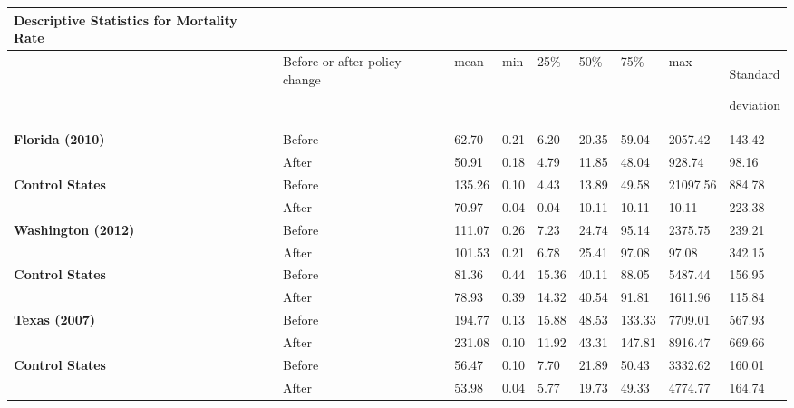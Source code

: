 \documentclass{article}
\begin{document}
\begin{longtable}[]{@{}lllllllll@{}}
\toprule
\textbf{Descriptive Statistics for Mortality Rate} & & & & & & &
&\tabularnewline
\midrule
\endhead
\begin{minipage}[t]{0.08\columnwidth}\raggedright
\strut
\end{minipage} & \begin{minipage}[t]{0.08\columnwidth}\raggedright
Before or after policy change\strut
\end{minipage} & \begin{minipage}[t]{0.08\columnwidth}\raggedright
mean\strut
\end{minipage} & \begin{minipage}[t]{0.08\columnwidth}\raggedright
min\strut
\end{minipage} & \begin{minipage}[t]{0.08\columnwidth}\raggedright
25\%\strut
\end{minipage} & \begin{minipage}[t]{0.08\columnwidth}\raggedright
50\%\strut
\end{minipage} & \begin{minipage}[t]{0.08\columnwidth}\raggedright
75\%\strut
\end{minipage} & \begin{minipage}[t]{0.08\columnwidth}\raggedright
max\strut
\end{minipage} & \begin{minipage}[t]{0.08\columnwidth}\raggedright
Standard

deviation\strut
\end{minipage}\tabularnewline
\textbf{Florida (2010)} & Before & 62.70 & 0.21 & 6.20 & 20.35 & 59.04 &
2057.42 & 143.42\tabularnewline
& After & 50.91 & 0.18 & 4.79 & 11.85 & 48.04 & 928.74 &
98.16\tabularnewline
\textbf{Control States} & Before & 135.26 & 0.10 & 4.43 & 13.89 & 49.58
& 21097.56 & 884.78\tabularnewline
& After & 70.97 & 0.04 & 0.04 & 10.11 & 10.11 & 10.11 &
223.38\tabularnewline
\textbf{Washington (2012)} & Before & 111.07 & 0.26 & 7.23 & 24.74 &
95.14 & 2375.75 & 239.21\tabularnewline
& After & 101.53 & 0.21 & 6.78 & 25.41 & 97.08 & 97.08 &
342.15\tabularnewline
\textbf{Control States} & Before & 81.36 & 0.44 & 15.36 & 40.11 & 88.05
& 5487.44 & 156.95\tabularnewline
& After & 78.93 & 0.39 & 14.32 & 40.54 & 91.81 & 1611.96 &
115.84\tabularnewline
\textbf{Texas (2007)} & Before & 194.77 & 0.13 & 15.88 & 48.53 & 133.33
& 7709.01 & 567.93\tabularnewline
& After & 231.08 & 0.10 & 11.92 & 43.31 & 147.81 & 8916.47 &
669.66\tabularnewline
\textbf{Control States} & Before & 56.47 & 0.10 & 7.70 & 21.89 & 50.43 &
3332.62 & 160.01\tabularnewline
& After & 53.98 & 0.04 & 5.77 & 19.73 & 49.33 & 4774.77 &
164.74\tabularnewline
\bottomrule
\end{longtable}
\end{document}
